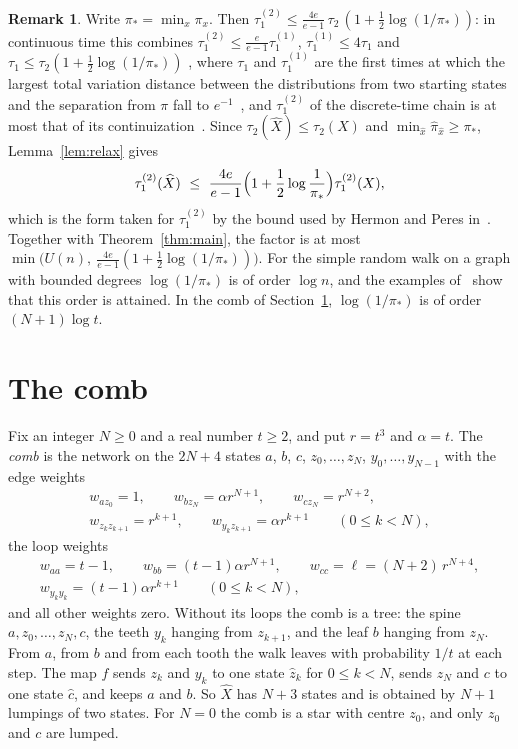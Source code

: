 \documentclass[11pt]{amsart}
\theoremstyle{definition}
\newtheorem{remark}[theorem]{Remark}
\newcommand{\tmix}{\tau_1^{(2)}}
\newcommand{\hpi}{\widehat{\pi}}
\newcommand{\hX}{\widehat{X}}
\begin{document}
\begin{remark}\label{rem:pimin}
Write $\pi_*=\min_x\pi_x$. Then $\tmix\le\frac{4e}{e-1}\,\tau_2\,(1+\frac12\log(1/\pi_*))$: in
continuous time this combines $\tmix\le\frac{e}{e-1}\tau_1^{(1)}$, $\tau_1^{(1)}\le4\tau_1$ and
$\tau_1\le\tau_2(1+\frac12\log(1/\pi_*))$ \cite[Lemmas~4.12, 4.11 and~4.23]{AF}, where $\tau_1$ and $\tau_1^{(1)}$ are the first times at which the
largest total variation distance between the distributions from two starting states and the separation from $\pi$
fall to $e^{-1}$~\cite[Section~4.3]{AF}, and $\tmix$ of the discrete-time chain
is at most that of its continuization~\cite[Lemma~4.16]{AF}. Since $\tau_2(\hX)\le\tau_2(X)$ and $\min_{\hat x}\hpi_{\hat x}\ge\pi_*$,
Lemma~\ref{lem:relax} gives
\[
\tmix(\hX)\ \le\ \frac{4e}{e-1}\Bigl(1+\frac12\log\frac1{\pi_*}\Bigr)\tmix(X),
\]
which is the form taken for $\tmix$ by the bound used by Hermon and Peres in~\cite[Remark~1.8]{HP}. Together with
Theorem~\ref{thm:main}, the factor is at most $\min\bigl(U(n),\ \frac{4e}{e-1}(1+\frac12\log(1/\pi_*))\bigr)$. For the
simple random walk on a graph with bounded degrees $\log(1/\pi_*)$ is of order $\log n$, and the examples
of~\cite{HP} show that this order is attained. In the comb of Section~\ref{sec:comb}, $\log(1/\pi_*)$ is of order
$(N+1)\log t$.
\end{remark}

\section{The comb}\label{sec:comb}
Fix an integer $N\ge0$ and a real number $t\ge2$, and put $r=t^3$ and $\alpha=t$. The \emph{comb} is the network on
the $2N+4$ states $a$, $b$, $c$, $z_0,\dots,z_N$, $y_0,\dots,y_{N-1}$ with the edge weights
\begin{gather*}
w_{az_0}=1,\qquad w_{bz_N}=\alpha r^{N+1},\qquad w_{cz_N}=r^{N+2},\\
w_{z_kz_{k+1}}=r^{k+1},\qquad w_{y_kz_{k+1}}=\alpha r^{k+1}\qquad(0\le k<N),
\end{gather*}
the loop weights
\begin{gather*}
w_{aa}=t-1,\qquad w_{bb}=(t-1)\alpha r^{N+1},\qquad w_{cc}=\ell=(N+2)\,r^{N+4},\\
w_{y_ky_k}=(t-1)\alpha r^{k+1}\qquad(0\le k<N),
\end{gather*}
and all other weights zero. Without its loops the comb is a tree: the spine $a,z_0,\dots,z_N,c$, the teeth $y_k$
hanging from $z_{k+1}$, and the leaf $b$ hanging from $z_N$. From $a$, from $b$ and from each tooth the walk leaves
with probability $1/t$ at each step. The map $f$ sends $z_k$ and $y_k$ to one state $\hat z_k$ for $0\le k<N$, sends
$z_N$ and $c$ to one state $\hat c$, and keeps $a$ and $b$. So $\hX$ has $N+3$ states and is obtained by $N+1$
lumpings of two states. For $N=0$ the comb is a star with centre $z_0$, and only $z_0$ and $c$ are lumped.
\end{document}
